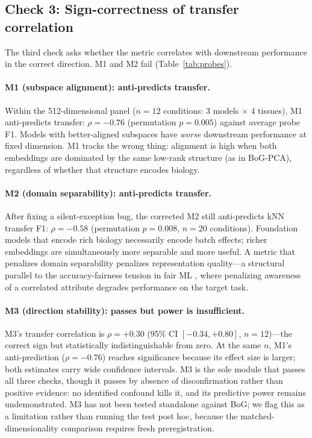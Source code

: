 \documentclass[10pt,letterpaper]{article}
\begin{document}
\subsection{Check 3: Sign-correctness of transfer correlation}

The third check asks whether the metric correlates with downstream performance in the correct direction. M1 and M2 fail (Table~\ref{tab:probes}).

\paragraph{M1 (subspace alignment): anti-predicts transfer.} Within the 512-dimensional panel ($n = 12$ conditions: 3 models $\times$ 4 tissues), M1 anti-predicts transfer: $\rho = -0.76$ (permutation $p = 0.005$) against average probe F1. Models with better-aligned subspaces have \emph{worse} downstream performance at fixed dimension. M1 tracks the wrong thing: alignment is high when both embeddings are dominated by the same low-rank structure (as in BoG-PCA), regardless of whether that structure encodes biology.

\paragraph{M2 (domain separability): anti-predicts transfer.} After fixing a silent-exception bug, the corrected M2 still anti-predicts kNN transfer F1: $\rho = -0.58$ (permutation $p = 0.008$, $n = 20$ conditions). Foundation models that encode rich biology necessarily encode batch effects; richer embeddings are simultaneously more separable and more useful. A metric that penalizes domain separability penalizes representation quality---a structural parallel to the accuracy-fairness tension in fair ML \citep{chouldechova2017impossibility}, where penalizing awareness of a correlated attribute degrades performance on the target task.

\paragraph{M3 (direction stability): passes but power is insufficient.} M3's transfer correlation is $\rho = +0.30$ (95\% CI $[-0.34, +0.80]$, $n = 12$)---the correct sign but statistically indistinguishable from zero. At the same $n$, M1's anti-prediction ($\rho = -0.76$) reaches significance because its effect size is larger; both estimates carry wide confidence intervals. M3 is the sole module that passes all three checks, though it passes by absence of disconfirmation rather than positive evidence: no identified confound kills it, and its predictive power remains undemonstrated. M3 has not been tested standalone against BoG; we flag this as a limitation rather than running the test post hoc, because the matched-dimensionality comparison requires fresh preregistration.
\end{document}
